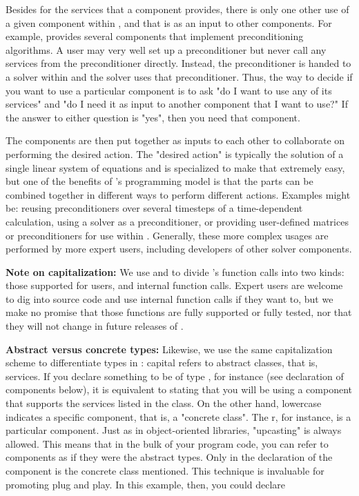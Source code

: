 \begin{enumerate}
Besides for the services that a component provides, there is only one other use
of a given component within 
\hypre{}, and that is as an input to other components. For example, \hypre{} provides
several components 
that implement preconditioning algorithms. A user may very well set up a
preconditioner but never call any 
services from the preconditioner directly. Instead, the preconditioner is
handed to a solver within \hypre{} 
and the solver uses that preconditioner. Thus, the way to decide if you want to
use a particular component 
is to ask "do I want to use any of its services" and "do I need it as input to
another component that I want to 
use?" If the answer to either question is "yes", then you need that component.

The components are then put together as inputs to each other to collaborate on
performing the desired 
action. The "desired action" is typically the solution of a single linear
system of equations and \hypre{} is 
specialized to make that extremely easy, but one of the benefits of \hypre{}'s
programming model is that 
the parts can be combined together in different ways to perform different
actions. Examples might be: 
reusing preconditioners over several timesteps of a time-dependent calculation,
using a solver as a 
preconditioner, or providing user-defined matrices or preconditioners for use
within \hypre{}. Generally, 
these more complex usages are performed by more expert users, including
developers of other solver 
components.

{\bf Note on capitalization:} We use  and 
to divide \hypre{}'s function
calls into two kinds: 
those supported for users, and internal function calls. Expert users are
welcome to dig into \hypre{} source 
code and use internal function calls if they want to, but we make no promise
that those functions are fully 
supported or fully tested, nor that they will not change in future releases of
\hypre{}. 

{\bf Abstract versus concrete types:} 
Likewise, we use the same capitalization scheme
to differentiate types in 
\hypre{}: capital  refers to abstract classes, that is, services. 
If you
declare something to be of 
type , for instance (see declaration of components below), it is
equivalent to stating that you 
will be using a component that supports the services listed in the 
class. On the other hand, 
lowercase  indicates a specific component, that is, a "concrete class".
The r, 
for instance, is a particular component. Just as in object-oriented libraries,
"upcasting" is always allowed. 
This means that in the bulk of your program code, you can refer to components
as if they were the abstract 
types. Only in the declaration of the component is the concrete class
mentioned. This technique is 
invaluable for promoting plug and play. In this example, then, you could
declare 


\end{enumerate}
